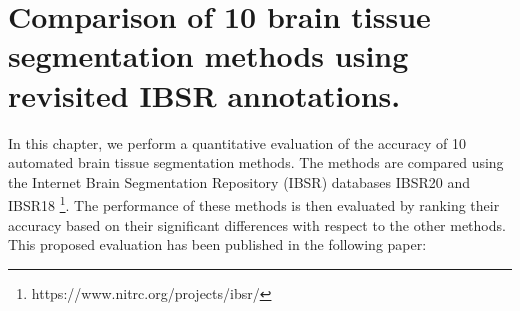 
\chapter{Comparison of 10 brain tissue segmentation methods using revisited IBSR annotations.}  
\label{chapter:chapter_2}

In this chapter, we perform a quantitative evaluation of the accuracy of 10 automated brain tissue segmentation methods. The methods are compared using the Internet Brain Segmentation Repository (IBSR) databases IBSR20 and IBSR18 \footnote{https://www.nitrc.org/projects/ibsr/}. The performance of these methods is then evaluated by ranking their accuracy based on their significant differences with respect to the other methods. This proposed evaluation has been published in the following paper:

\vspace{2cm}

\noindent{}





